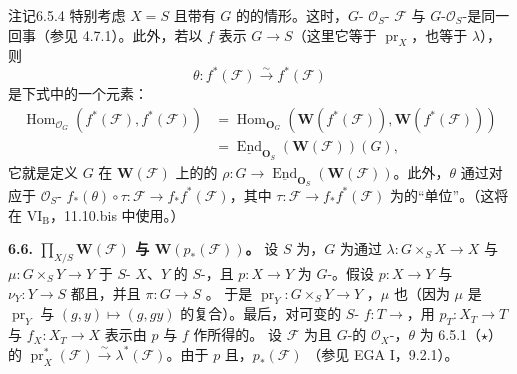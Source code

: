 \begin{SGAresult}{注记}{6.5.4}
特别考虑 $X=S$ 且带有 $G$ 的的情形。这时，$G$- $\mathcal O_S$- $\mathcal F$ 与 $G$-$\mathcal O_S$-是同一回事（参见 4.7.1）。此外，若以 $f$ 表示 $G\to S$（这里它等于 $\operatorname{pr}_X$，也等于 $\lambda$），则
\[
\theta:f^*(\mathcal F)\xrightarrow\sim f^*(\mathcal F)\tag{$\star$}
\]
是下式中的一个元素：
\[
\begin{aligned}
\operatorname{Hom}_{\mathcal O_G}(f^*(\mathcal F),f^*(\mathcal F))
&=\operatorname{Hom}_{\mathbf O_G}(\mathbf W(f^*(\mathcal F)),\mathbf W(f^*(\mathcal F)))\\
&=\underline{\operatorname{End}}_{\mathbf O_S}(\mathbf W(\mathcal F))(G),
\end{aligned}
\]
它就是定义 $G$ 在 $\mathbf W(\mathcal F)$ 上的的 $\rho:G\to\underline{\operatorname{End}}_{\mathbf O_S}(\mathbf W(\mathcal F))$。此外，$\theta$ 通过对应于 $\mathcal O_S$- $f_*(\theta)\circ\tau:\mathcal F\to f_*f^*(\mathcal F)$，其中 $\tau:\mathcal F\to f_*f^*(\mathcal F)$ 为的“单位”。（这将在 $\mathrm{VI_B}$，11.10.bis 中使用。）
\end{SGAresult}

\textbf{6.6.  $\prod_{X/S}\mathbf W(\mathcal F)$ 与 $\mathbf W(p_*(\mathcal F))$。} 设 $S$ 为，$G$ 为通过 $\lambda:G\times_S X\to X$ 与 $\mu:G\times_S Y\to Y$ 于 $S$- $X$、$Y$ 的 $S$-，且 $p:X\to Y$ 为 $G$-。假设 $p:X\to Y$ 与 $\nu_Y:Y\to S$ 都且，并且 $\pi:G\to S$ 。
于是 $\operatorname{pr}_Y:G\times_S Y\to Y$ ，$\mu$ 也（因为 $\mu$ 是 $\operatorname{pr}_Y$ 与 $(g,y)\mapsto(g,gy)$ 的复合）。最后，对可变的 $S$- $f:T\to{}$，用 $p_T:X_T\to T$ 与 $f_X:X_T\to X$ 表示由 $p$ 与 $f$ 作所得的。
设 $\mathcal F$ 为且 $G$-的 $\mathcal O_X$-，$\theta$ 为 6.5.1（$\star$）的 $\operatorname{pr}_X^*(\mathcal F)\xrightarrow\sim\lambda^*(\mathcal F)$。由于 $p$ 且，$p_*(\mathcal F)$ （参见 EGA I，9.2.1）。


